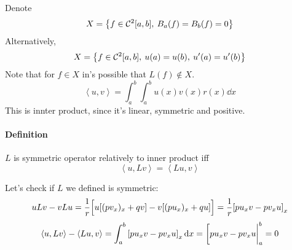 Denote
$$X = \qty{ f\in \mathcal{C}^2[a,b], \: B_a(f)=B_b(f) = 0 }$$
Alternatively,
$$X = \qty{ f\in \mathcal{C}^2[a,b], \:  u(a)=u(b), \: u'(a)=u'(b) }$$
Note that for $f\in X$ in's possible that $L(f) \notin X$.
$$\left\langle u,v\right\rangle = \int_a^b \int_a^b u(x)v(x) r(x) \dd{x} $$
This is innter product, since it's linear, symmetric and positive.
\paragraph{Definition} $L$ is symmetric operator relatively to inner product iff
$$\left\langle u,Lv\right\rangle =\left\langle Lu,v\right\rangle $$

Let's check if $L$ we defined is symmetric:
$$uLv-vLu = \frac{1}{r}\qty\Big[u\qty[(pv_x)_x + qv ]- v\qty[(pu_x)_x + qu]] =\frac{1}{r}\qty[ pu_xv - pv_x u]_x$$
$$\left\langle u,Lv\right\rangle - \left\langle Lu,v\right\rangle = \int_a^b \qty[ pu_xv - pv_x u]_x \dd{x} = \eval[pu_xv - pv_x u|_{a}^{b} = 0$$
